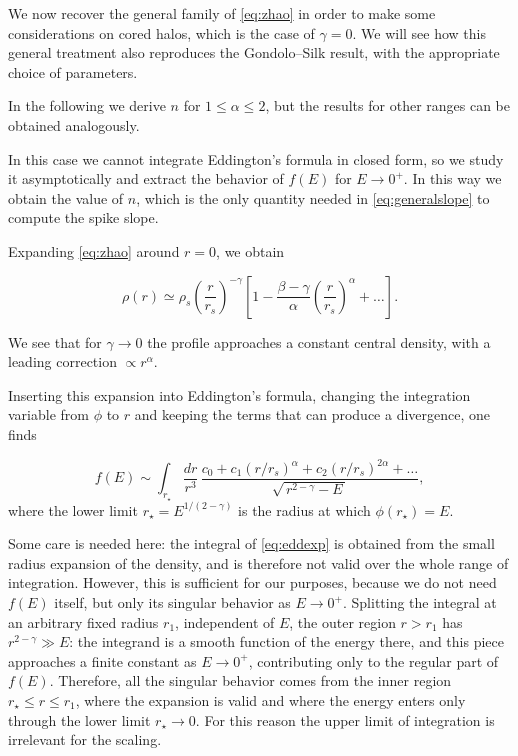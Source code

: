 We now recover the general family of \cref{eq:zhao} in order to make some
considerations on cored halos,
which is the case of $\gamma = 0$.
We will see how this general treatment also reproduces the Gondolo--Silk result, with the appropriate choice of parameters.

In the following we derive $n$ for $1 \le \alpha \le 2$, but the results for other ranges can be obtained analogously. 

In this case we cannot integrate Eddington's formula in closed form, so we study it asymptotically
and extract the behavior of $f(E)$ for $E \to 0^{+}$. In this way we obtain the value of $n$,
which is the only quantity needed in \cref{eq:generalslope} to compute the spike slope.


Expanding \cref{eq:zhao} around $r=0$, we obtain

\begin{equation} \label{eq:zhaoexp}
\rho(r)
\simeq
\rho_s \left( \frac{r}{r_s} \right)^{-\gamma}
\left[ 1 - \frac{\beta-\gamma}{\alpha} \left( \frac{r}{r_s} \right)^{\alpha}
+ \dots \right].
\end{equation}

We see that for $\gamma \to 0$ the profile approaches a constant central
density, with a leading correction $\propto r^{\alpha}$.

Inserting this expansion into Eddington's formula, changing the integration variable from $\phi$ to
$r$ and keeping the terms that can produce a divergence, one finds
\cite{Ullio_2001}

\begin{equation} \label{eq:eddexp}
f(E)
\sim
\int_{r_\star} \frac{dr}{r^{3}}\,
\frac{c_0 + c_1 (r/r_s)^{\alpha} + c_2 (r/r_s)^{2\alpha} + \dots}
{\sqrt{\, r^{2-\gamma} - E \,}},
\end{equation}
where the lower limit $r_\star = E^{1/(2-\gamma)}$ is the radius at which $\phi(r_\star) = E$.

Some care is needed here: the integral of \cref{eq:eddexp} is obtained from the small radius expansion of the density,
and is therefore not valid over the whole range of integration. 
However, this is sufficient for our purposes, because we do not need $f(E)$ itself, but
only its singular behavior as $E \to 0^{+}$.
Splitting the integral at an
arbitrary fixed radius $r_1$, independent of $E$, the outer region
$r > r_1$ has $r^{2-\gamma} \gg E$: the integrand is a smooth function of
the energy there, and this piece approaches a finite constant as
$E \to 0^{+}$, contributing only to the regular part of $f(E)$.
Therefore, all the singular behavior comes from the inner region $r_\star \leq r
\leq r_1$, where the expansion is valid and where the energy enters only through the lower
limit $r_\star \to 0$. For this reason the upper limit of integration is
irrelevant for the scaling.



